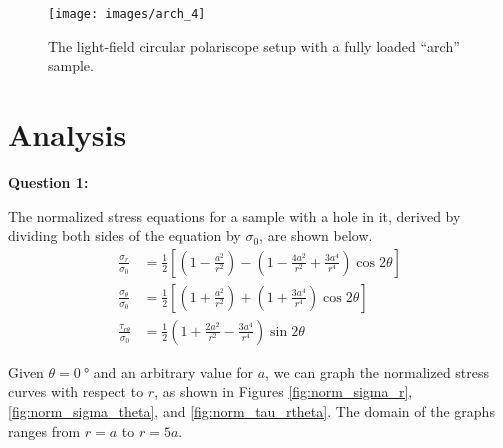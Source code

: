 \documentclass[12 pt]{article}
\begin{document}
\begin{figure}[htbp]
\centering
\texttt{[image: images/arch\_4]}
\caption{The light-field circular polariscope setup with a fully loaded ``arch'' sample.}
\label{fig:arch_4}
\end{figure}

\section{Analysis} \label{analysis}
\textbf{Question 1:}

The normalized stress equations for a sample with a hole in it, derived by dividing both sides of the equation by $\sigma_0$, are shown below.
\begin{align}
\frac{\sigma_r}{\sigma_0}&=\frac{1}{2}\left[\left(1-\frac{a^2}{r^2}\right)-\left(1-\frac{4a^2}{r^2}+\frac{3a^4}{r^4}\right)\cos2\theta\right] \\
\frac{\sigma_\theta}{\sigma_0}&=\frac{1}{2}\left[\left(1+\frac{a^2}{r^2}\right)+\left(1+\frac{3a^4}{r^4}\right)\cos2\theta\right] \label{eqn:norm_sigma_theta} \\
\frac{\tau_{r\theta}}{\sigma_0}&=\frac{1}{2}\left(1+\frac{2a^2}{r^2}-\frac{3a^4}{r^4}\right)\sin2\theta
\end{align}

Given $\theta=\qty{0}{\degree}$ and an arbitrary value for $a$, we can graph the normalized stress curves with respect to $r$, as shown in Figures \ref{fig:norm_sigma_r}, \ref{fig:norm_sigma_theta}, and \ref{fig:norm_tau_rtheta}. The domain of the graphs ranges from $r=a$ to $r=5a$.
\end{document}
